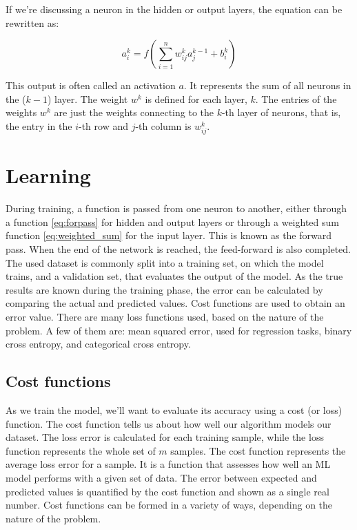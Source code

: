 If we're discussing a neuron in the hidden or output layers, the equation can be rewritten as:

\begin{equation}
	a_i^k =f\left(\sum_{i=1}^{n} w_{ij}^k a_j^{k-1} + b_i^k\right)
	\label{eq:forpasshidden}
\end{equation}

This output is often called an activation $a$. It represents the sum of all neurons in the ($k-1$) layer. The weight $w^k$ is defined for each layer, $k$. The entries of the weights $w^k$ are just the weights connecting to the $k$-th layer of neurons, that is, the entry in the $i$-th row and $j$-th column is $w^k_{ij}$.


\section{Learning}

During training, a function is passed from one neuron to another, either through a function \ref{eq:forpass} for hidden and output layers or through a weighted sum function \ref{eq:weighted_sum} for the input layer. This is known as the forward pass. When the end of the network is reached, the feed-forward is also completed.\newline
The used dataset is commonly split into a training set, on which the model trains, and a validation set, that evaluates the output of the model. 
As the true results are known during the training phase, the error can be calculated by comparing the actual and predicted values. Cost functions are used to obtain an error value.\newline
There are many loss functions used, based on the nature of the problem. A few of them are: mean squared error, used for regression tasks, binary cross entropy, and categorical cross entropy.
\subsection{Cost functions}
As we train the model, we’ll want to evaluate its accuracy using a cost (or loss) function. The cost function tells us about how well our algorithm models our dataset. The loss error is calculated for each training sample, while the loss function represents the whole set of $m$ samples. The cost function represents the average loss error for a sample. It is a function that assesses how well an ML model performs with a given set of data. The error between expected and predicted values is quantified by the cost function and shown as a single real number. Cost functions can be formed in a variety of ways, depending on the nature of the problem.
